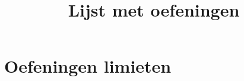 \documentclass{xourse}
\title{Lijst met oefeningen}
\begin{document}
\part{Oefeningen limieten}
\end{document}
